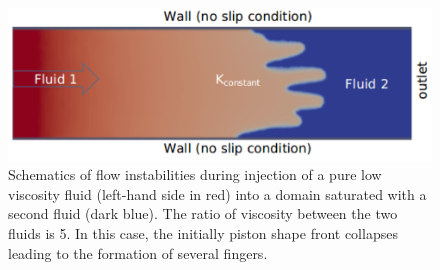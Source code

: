 




\begin{figure}[ht]
\centering
\vbox{\includegraphics[width=\textwidth]{./Pics/phase_vol_frac_uni_perm_1}}
\caption{Schematics of flow instabilities during injection of a pure low viscosity fluid (left-hand side in red) into a domain saturated with a second fluid (dark blue). The ratio of viscosity between the two fluids is 5. In this case, the initially piston shape front collapses leading to the formation of several fingers.}
\label{fig:simple_case}
\end{figure}
\clearpage



